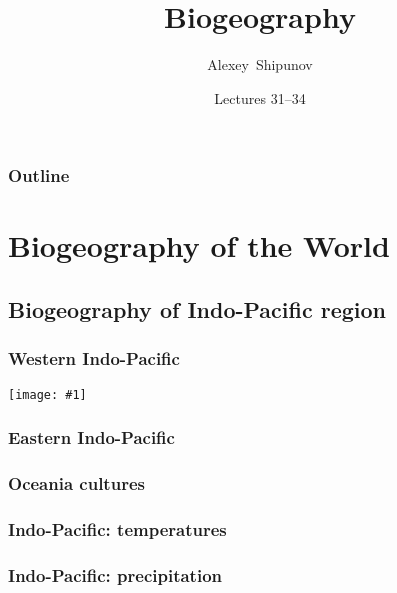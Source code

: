 \documentclass{beamer}
\title{Biogeography}
\author[Shipunov]{Alexey~Shipunov}
\institute[MSU]{Minot State University}
\date{Lectures 31--34}
\newcommand{\Max}[1]{\texttt{[image: \#1]}}
\begin{document}
\begin{frame}
\titlepage
\end{frame}


\begin{frame}
\frametitle{Outline}
\tableofcontents[pausesections]
\end{frame}


\section{Biogeography of the World}
\subsection{Biogeography of Indo-Pacific region}


\begin{frame}
\frametitle{Western Indo-Pacific}

\centering

\Max{example-image-a}%

\end{frame}


\begin{frame}
\frametitle{Eastern Indo-Pacific}

\centering


\end{frame}


\begin{frame}
\frametitle{Oceania cultures}

\centering


\end{frame}


\begin{frame}
\frametitle{Indo-Pacific: temperatures}

\centering


\end{frame}


\begin{frame}
\frametitle{Indo-Pacific: precipitation}

\centering


\end{frame}
\end{document}
